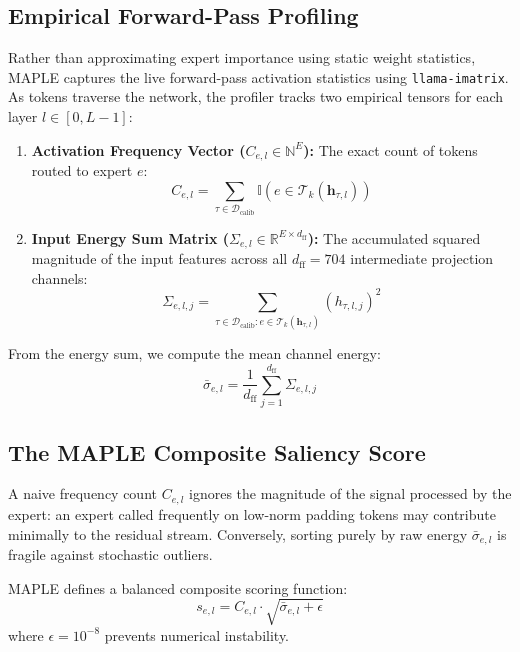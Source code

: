 \documentclass[conference]{IEEEtran}
\newcommand{\MAPLE}{\textsc{MAPLE}}
\newcommand{\R}{\mathbb{R}}
\begin{document}
\subsection{Empirical Forward-Pass Profiling}
Rather than approximating expert importance using static weight statistics, \MAPLE{} captures the live forward-pass activation statistics using \texttt{llama-imatrix}. As tokens traverse the network, the profiler tracks two empirical tensors for each layer $l \in [0, L-1]$:

\begin{enumerate}
\item \textbf{Activation Frequency Vector ($C_{e,l} \in \mathbb{N}^E$):} The exact count of tokens routed to expert $e$:
\begin{equation}
C_{e,l} = \sum_{\tau \in \mathcal{D}_\text{calib}} \mathbb{I}(e \in \mathcal{T}_k(\mathbf{h}_{\tau,l}))
\end{equation}
\item \textbf{Input Energy Sum Matrix ($\Sigma_{e,l} \in \R^{E \times d_\text{ff}}$):} The accumulated squared magnitude of the input features across all $d_\text{ff} = 704$ intermediate projection channels:
\begin{equation}
\Sigma_{e,l,j} = \sum_{\tau \in \mathcal{D}_\text{calib}: e \in \mathcal{T}_k(\mathbf{h}_{\tau,l})} (h_{\tau,l,j})^2
\end{equation}
\end{enumerate}
From the energy sum, we compute the mean channel energy:
\begin{equation}
\bar{\sigma}_{e,l} = \frac{1}{d_\text{ff}} \sum_{j=1}^{d_\text{ff}} \Sigma_{e,l,j}
\end{equation}

\subsection{The MAPLE Composite Saliency Score}
A naive frequency count $C_{e,l}$ ignores the magnitude of the signal processed by the expert: an expert called frequently on low-norm padding tokens may contribute minimally to the residual stream. Conversely, sorting purely by raw energy $\bar{\sigma}_{e,l}$ is fragile against stochastic outliers.

\MAPLE{} defines a balanced composite scoring function:
\begin{equation}
s_{e,l} = C_{e,l} \cdot \sqrt{\bar{\sigma}_{e,l} + \epsilon}
\end{equation}
where $\epsilon = 10^{-8}$ prevents numerical instability. 
\end{document}
